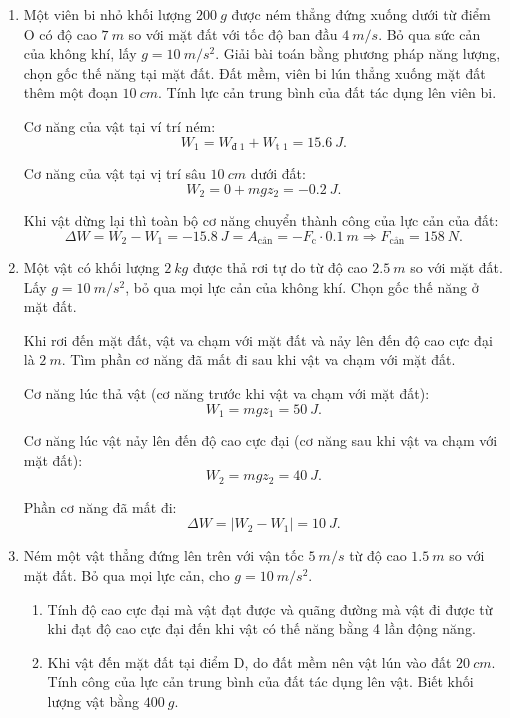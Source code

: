 \begin{enumerate}[label=\bfseries Câu \arabic*:, leftmargin=1.5cm]
	
	
	\item {}
	
	
	{
		Một viên bi nhỏ khối lượng $\SI{200}{g}$ được ném thẳng đứng xuống dưới từ điểm O có độ cao $\SI{7}{m}$ so với mặt đất với tốc độ ban đầu $\SI{4}{m/s}$. Bỏ qua sức cản của không khí, lấy $g=\SI{10}{m/s^2}$. Giải bài toán bằng phương pháp năng lượng, chọn gốc thế năng tại mặt đất. Đất mềm, viên bi lún thẳng xuống mặt đất thêm một đoạn $\SI{10}{cm}$. Tính lực cản trung bình của đất tác dụng lên viên bi.
	}
	
	\hideall
	{	
		Cơ năng của vật tại ví trí ném:
		$$W_1 = W_\text{đ 1} + W_\text{t 1} = \SI{15.6}{J}.$$
		
		Cơ năng của vật tại vị trí sâu $\SI{10}{cm}$ dưới đất:
		$$W_2 = 0 + mgz_2 = \SI{-0.2}{J}.$$
		
		Khi vật dừng lại thì toàn bộ cơ năng chuyển thành công của lực cản của đất:
		$$\Delta W = W_2 - W_1 = \SI{-15.8}{J}= A_\text{cản} = -F_\text{c} \cdot \SI{0.1}{m} \Rightarrow F_\text{cản} = \SI{158}{N}.$$
	}
	\item {}
	
	
	{
		Một vật có khối lượng $\SI{2}{kg}$ được thả rơi tự do từ độ cao $\SI{2.5}{m}$ so với mặt đất. Lấy $g=\SI{10}{m/s^2}$, bỏ qua mọi lực cản của không khí. Chọn gốc thế năng ở mặt đất.
		
		Khi rơi đến mặt đất, vật va chạm với mặt đất và nảy lên đến độ cao cực đại là $\SI{2}{m}$. Tìm phần cơ năng đã mất đi sau khi vật va chạm với mặt đất.
	}
	
	\hideall
	{	
		Cơ năng lúc thả vật (cơ năng trước khi vật va chạm với mặt đất):
		$$W_1 = mgz_1 = \SI{50}{J}.$$
		
		Cơ năng lúc vật nảy lên đến độ cao cực đại (cơ năng sau khi vật va chạm với mặt đất):
		$$W_2 = mgz_2 = \SI{40}{J}.$$
		
		Phần cơ năng đã mất đi: $$\Delta W = |W_2 - W_1| = \SI{10}{J}.$$
	}
	
	\item {}
	
	
	{
		Ném một vật thẳng đứng lên trên với vận tốc $\SI{5}{m/s}$ từ độ cao $\SI{1.5}{m}$ so với mặt đất. Bỏ qua mọi lực cản, cho $g=\SI{10}{m/s^2}$.
		\begin{enumerate}[label=\alph*)]
			\item Tính độ cao cực đại mà vật đạt được và quãng đường mà vật đi được từ khi đạt độ cao cực đại đến khi vật có thế năng bằng 4 lần động năng.
			\item Khi vật đến mặt đất tại điểm D, do đất mềm nên vật lún vào đất $\SI{20}{cm}$. Tính công của lực cản trung bình của đất tác dụng lên vật. Biết khối lượng vật bằng $\SI{400}{g}$.
		\end{enumerate}
	}
	

\end{enumerate}
